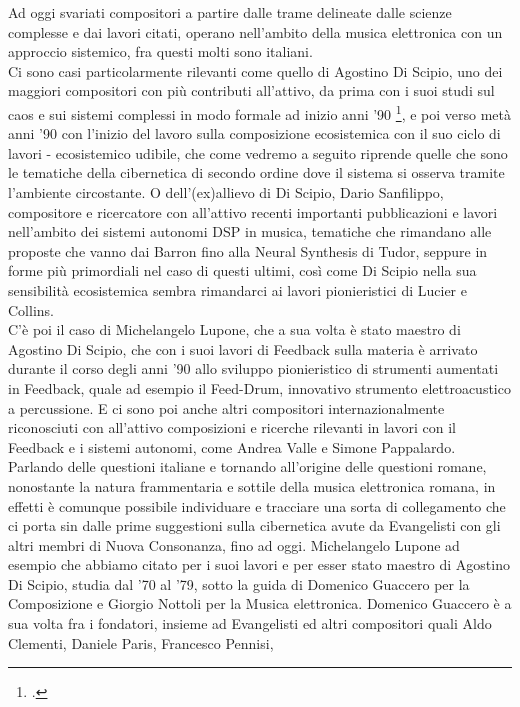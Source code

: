 Ad oggi svariati compositori a partire dalle trame delineate dalle scienze complesse e
dai lavori citati, operano nell'ambito della musica elettronica con un approccio sistemico,
fra questi molti sono italiani. \\
Ci sono casi particolarmente rilevanti come quello di Agostino Di Scipio,
uno dei maggiori compositori con più contributi all'attivo,
da prima con i suoi studi sul caos e sui sistemi complessi in modo formale ad inizio
anni '90 \footcite{discipioiterated},
e poi verso metà anni '90 con l'inizio del lavoro sulla composizione ecosistemica
con il suo ciclo di lavori
- ecosistemico udibile, che come vedremo a seguito riprende
quelle che sono le tematiche della cibernetica di secondo ordine dove
il sistema si osserva tramite l'ambiente circostante.
O dell'(ex)allievo di Di Scipio, Dario Sanfilippo,
compositore e ricercatore con all'attivo recenti importanti pubblicazioni e lavori
nell'ambito dei sistemi autonomi DSP in musica, tematiche che rimandano
alle proposte che vanno dai Barron fino alla Neural Synthesis di Tudor,
seppure in forme più primordiali nel caso di questi ultimi,
così come Di Scipio nella sua sensibilità ecosistemica sembra rimandarci ai
lavori pionieristici di Lucier e Collins. \\
C'è poi il caso di Michelangelo Lupone, che a sua volta è stato maestro
di Agostino Di Scipio,
che con i suoi lavori di Feedback sulla materia è arrivato durante il corso degli
anni '90 allo sviluppo
pionieristico di strumenti aumentati in Feedback, quale ad esempio il Feed-Drum,
innovativo strumento elettroacustico a percussione.
E ci sono poi anche altri compositori internazionalmente riconosciuti
con all'attivo composizioni e ricerche rilevanti in lavori con il Feedback
e i sistemi autonomi, come Andrea Valle e Simone Pappalardo. \\
Parlando delle questioni italiane e tornando all'origine delle questioni romane,
nonostante la natura frammentaria e sottile della musica elettronica romana,
in effetti è comunque possibile individuare e tracciare una sorta di collegamento
che ci porta sin dalle prime suggestioni sulla cibernetica avute da Evangelisti
con gli altri membri di Nuova Consonanza, fino ad oggi.
Michelangelo Lupone ad esempio che abbiamo citato per i suoi lavori
e per esser stato maestro di Agostino Di Scipio, studia dal ’70 al ’79,
sotto la guida di Domenico Guaccero per la Composizione
e Giorgio Nottoli per la Musica elettronica.
Domenico Guaccero è a sua volta fra i fondatori, insieme ad Evangelisti
ed altri compositori
quali Aldo Clementi, Daniele Paris, Francesco Pennisi,
